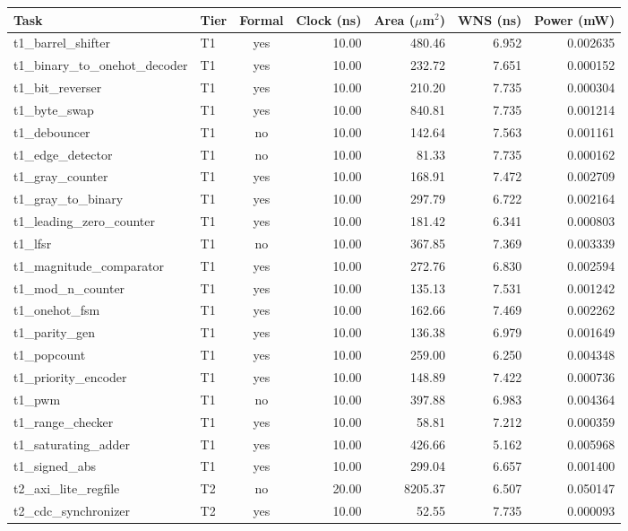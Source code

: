 \begin{tabular}{llcrrrr}
\toprule
Task & Tier & Formal & Clock (ns) & Area ($\mu$m$^2$) & WNS (ns) & Power (mW) \\
\midrule
t1\_barrel\_shifter & T1 & yes & 10.00 & 480.46 & 6.952 & 0.002635 \\
t1\_binary\_to\_onehot\_decoder & T1 & yes & 10.00 & 232.72 & 7.651 & 0.000152 \\
t1\_bit\_reverser & T1 & yes & 10.00 & 210.20 & 7.735 & 0.000304 \\
t1\_byte\_swap & T1 & yes & 10.00 & 840.81 & 7.735 & 0.001214 \\
t1\_debouncer & T1 & no & 10.00 & 142.64 & 7.563 & 0.001161 \\
t1\_edge\_detector & T1 & no & 10.00 & 81.33 & 7.735 & 0.000162 \\
t1\_gray\_counter & T1 & yes & 10.00 & 168.91 & 7.472 & 0.002709 \\
t1\_gray\_to\_binary & T1 & yes & 10.00 & 297.79 & 6.722 & 0.002164 \\
t1\_leading\_zero\_counter & T1 & yes & 10.00 & 181.42 & 6.341 & 0.000803 \\
t1\_lfsr & T1 & no & 10.00 & 367.85 & 7.369 & 0.003339 \\
t1\_magnitude\_comparator & T1 & yes & 10.00 & 272.76 & 6.830 & 0.002594 \\
t1\_mod\_n\_counter & T1 & yes & 10.00 & 135.13 & 7.531 & 0.001242 \\
t1\_onehot\_fsm & T1 & yes & 10.00 & 162.66 & 7.469 & 0.002262 \\
t1\_parity\_gen & T1 & yes & 10.00 & 136.38 & 6.979 & 0.001649 \\
t1\_popcount & T1 & yes & 10.00 & 259.00 & 6.250 & 0.004348 \\
t1\_priority\_encoder & T1 & yes & 10.00 & 148.89 & 7.422 & 0.000736 \\
t1\_pwm & T1 & no & 10.00 & 397.88 & 6.983 & 0.004364 \\
t1\_range\_checker & T1 & yes & 10.00 & 58.81 & 7.212 & 0.000359 \\
t1\_saturating\_adder & T1 & yes & 10.00 & 426.66 & 5.162 & 0.005968 \\
t1\_signed\_abs & T1 & yes & 10.00 & 299.04 & 6.657 & 0.001400 \\
t2\_axi\_lite\_regfile & T2 & no & 20.00 & 8205.37 & 6.507 & 0.050147 \\
t2\_cdc\_synchronizer & T2 & yes & 10.00 & 52.55 & 7.735 & 0.000093 \\

\end{tabular}
